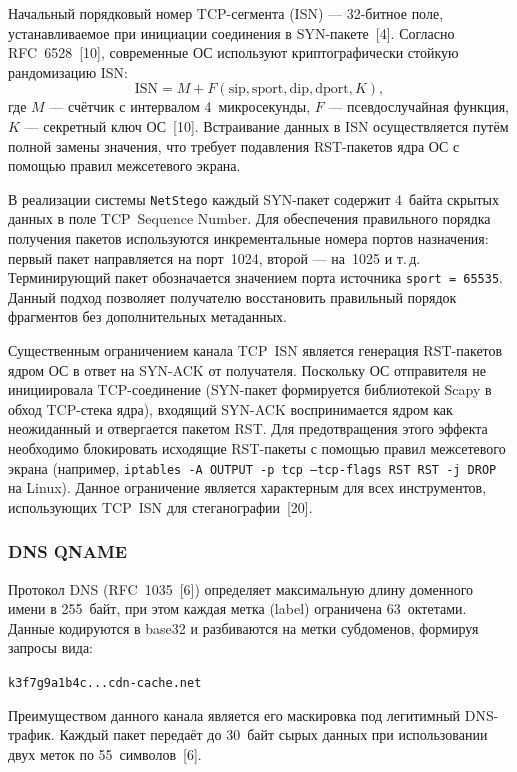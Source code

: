 Начальный порядковый номер TCP-сегмента (ISN) --- 32-битное поле, устанавливаемое при инициации соединения в SYN-пакете~[4]. Согласно RFC~6528~[10], современные ОС используют криптографически стойкую рандомизацию ISN:
\begin{equation}
\text{ISN} = M + F(\text{sip}, \text{sport}, \text{dip}, \text{dport}, K),
\label{eq:isn_rfc6528}
\end{equation}
где $M$ --- счётчик с интервалом 4~микросекунды, $F$ --- псевдослучайная функция, $K$ --- секретный ключ ОС~[10]. Встраивание данных в ISN осуществляется путём полной замены значения, что требует подавления RST-пакетов ядра ОС с помощью правил межсетевого экрана.

В реализации системы \texttt{NetStego} каждый SYN-пакет содержит 4~байта скрытых данных в поле TCP~Sequence Number. Для обеспечения правильного порядка получения пакетов используются инкрементальные номера портов назначения: первый пакет направляется на порт~1024, второй --- на~1025 и т.\,д. Терминирующий пакет обозначается значением порта источника \texttt{sport~=~65535}. Данный подход позволяет получателю восстановить правильный порядок фрагментов без дополнительных метаданных.

Существенным ограничением канала TCP~ISN является генерация RST-пакетов ядром ОС в ответ на SYN-ACK от получателя. Поскольку ОС отправителя не инициировала TCP-соединение (SYN-пакет формируется библиотекой Scapy в обход TCP-стека ядра), входящий SYN-ACK воспринимается ядром как неожиданный и отвергается пакетом RST. Для предотвращения этого эффекта необходимо блокировать исходящие RST-пакеты с помощью правил межсетевого экрана (например, \texttt{iptables~-A~OUTPUT~-p~tcp~--tcp-flags~RST~RST~-j~DROP} на Linux). Данное ограничение является характерным для всех инструментов, использующих TCP~ISN для стеганографии~[20].

\subsubsection{DNS QNAME}

Протокол DNS (RFC~1035~[6]) определяет максимальную длину доменного имени в 255~байт, при этом каждая метка (label) ограничена 63~октетами. Данные кодируются в base32 и разбиваются на метки субдоменов, формируя запросы вида:
\begin{center}
\texttt{k3f7g9a1b4c...cdn-cache.net}
\end{center}

Преимуществом данного канала является его маскировка под легитимный DNS-трафик. Каждый пакет передаёт до 30~байт сырых данных при использовании двух меток по 55~символов~[6].

